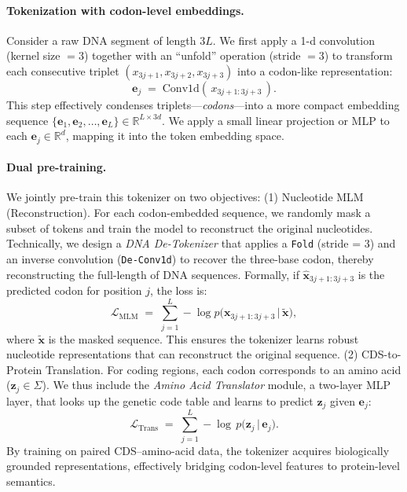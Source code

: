 \paragraph{Tokenization with codon-level embeddings.}
Consider a raw DNA segment of length \(3L\). We first apply a 1-d convolution (kernel size \(=3\)) together with an ``unfold'' operation (stride \(=3\)) to transform each consecutive triplet \((x_{3j+1}, x_{3j+2}, x_{3j+3})\) into a codon-like representation:
\[
\mathbf{e}_j \;=\; \mathrm{Conv1d}(\,x_{3j+1:3j+3}\,).
\]
This step effectively condenses triplets---\emph{codons}---into a more compact embedding sequence \(\{\mathbf{e}_1, \mathbf{e}_2, \dots, \mathbf{e}_L\} \in \mathbb{R}^{L\times 3d}\). We apply a small linear projection or MLP to each \(\mathbf{e}_j \in \mathbb{R}^{d}\), mapping it into the token embedding space.

\paragraph{Dual pre-training.}
\label{sec:tokenizer_tasks}
We jointly pre-train this tokenizer on two objectives:
(1) Nucleotide MLM (Reconstruction).
    For each codon-embedded sequence, we randomly mask a subset of tokens and train the model to reconstruct the original nucleotides. Technically, we design a \textit{DNA De-Tokenizer} that applies a \texttt{Fold} (stride = 3) and an inverse convolution (\texttt{De-Conv1d}) to recover the three-base codon, thereby reconstructing the full-length of DNA sequences. Formally, if \(\widehat{\mathbf{x}}_{3j+1:3j+3}\) is the predicted codon for position \(j\), the loss is:
    \begin{equation}
        \label{eq:loss_MLM}
        \mathcal{L}_{\mathrm{MLM}} \;=\; 
        \sum_{j=1}^L 
        -\log p\bigl(\mathbf{x}_{3j+1:3j+3} \,\big\vert\, \widetilde{\mathbf{x}}\bigr),
    \end{equation}
    where \(\widetilde{\mathbf{x}}\) is the masked sequence. This ensures the tokenizer learns robust nucleotide representations that can reconstruct the original sequence.
(2) CDS-to-Protein Translation.
    For coding regions, each codon corresponds to an amino acid (\(\mathbf{z}_j \in \Sigma\)). We thus include the \textit{Amino Acid Translator} module, a two-layer MLP layer, that looks up the genetic code table and learns to predict \(\mathbf{z}_j\) given \(\mathbf{e}_j\):
    \begin{equation}
        \label{eq:loss_trans}
        \mathcal{L}_{\mathrm{Trans}} \;=\; 
        \sum_{j=1}^L 
        -\log\,p\bigl(\mathbf{z}_j \,\big\vert\, \mathbf{e}_j\bigr).
    \end{equation}
    By training on paired CDS--amino-acid data, the tokenizer acquires biologically grounded representations, effectively bridging codon-level features to protein-level semantics.

